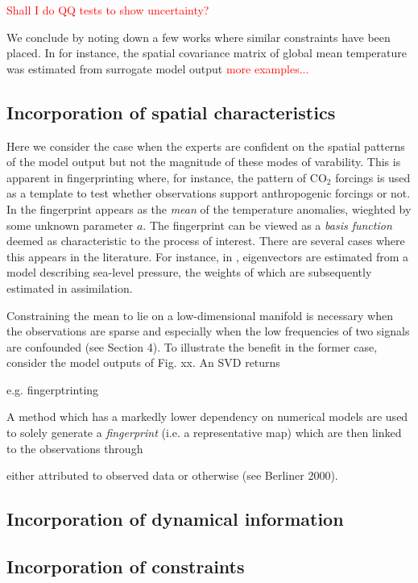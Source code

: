 \documentclass[10pt,a4paper]{article}
\newcommand{\red}{\textcolor{red}}
\begin{document}
\red{Shall I do QQ tests to show uncertainty? }

We conclude by noting down a few works where similar constraints have been placed. In \citep{Berliner_2000} for instance, the spatial covariance matrix of global mean temperature was estimated from surrogate model output \red{more examples...}

\subsection{Incorporation of spatial characteristics}

Here we consider the case when the experts are confident on the spatial patterns of the model output but not the magnitude of these modes of varability. This is apparent in fingerprinting where, for instance, the pattern of CO$_2$ forcings is used as a template to test whether observations support anthropogenic forcings or not. In \citep{Berliner_2000} the fingerprint appears as the \emph{mean} of the temperature anomalies, wieghted by some unknown parameter $a$. The fingerprint can be viewed as a \emph{basis function} deemed as characteristic to the process of interest. There are several cases where this appears in the literature. For instance, in \cite{Wikle_2001}, eigenvectors are estimated from a model describing sea-level pressure, the weights of which are subsequently estimated in assimilation.

Constraining the mean to lie on a low-dimensional manifold is necessary when the observations are sparse and especially when the low frequencies of two signals are confounded (see Section 4). To illustrate the benefit in the former case, consider the model outputs of Fig. xx. An SVD returns 

e.g. fingerptrinting

A method which has a markedly lower dependency on numerical models are used to solely generate a \emph{fingerprint} (i.e. a representative map) which are then linked to the observations through


either attributed to observed data or otherwise (see Berliner 2000). 


\subsection{Incorporation of dynamical information}

\subsection{Incorporation of constraints}
\end{document}
